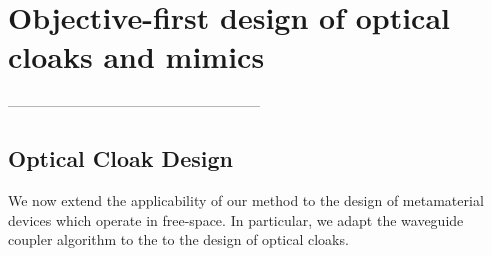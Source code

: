 \renewcommand{\myfig}[2]{
    \begin{figure}[!h]\begin{center}
    \texttt{[image: meta/fig/\#1]}\caption{#2}\label{fig:#1}
    \end{center}\end{figure}}




\newcommand{\ER}[1]{\eqref{eq:#1}}
\newcommand{\SR}[1]{Section~\ref{sec:#1}}
\newcommand{\sR}[1]{section~\ref{sec:#1}}
\newcommand{\FR}[1]{Figure~\ref{fig:#1}}
\newcommand{\fR}[1]{figure~\ref{fig:#1}}

\chapter[Design of optical cloaks and mimics]{Objective-first design of optical cloaks and mimics}\label{ob-1 meta}
------------------------------------------------------%
\section{Optical Cloak Design}
We now extend the applicability of our method
    to the design of metamaterial devices which operate in free-space.
In particular,
    we adapt the waveguide coupler algorithm to the 
    to the design of optical cloaks.




